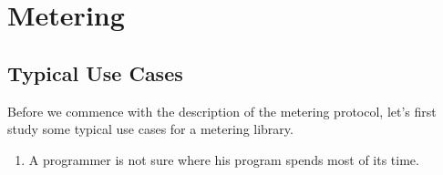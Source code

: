 \chapter{Metering}

\section{Typical Use Cases}

Before we commence with the description of the metering protocol, let's
first study some typical use cases for a metering library.

\begin{enumerate}
\item A programmer is not sure where his program spends most of its time.
\end{enumerate}
